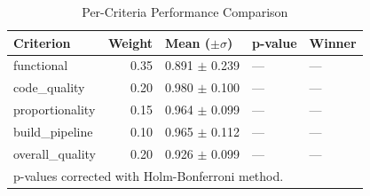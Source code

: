 \begin{table}[htbp]
\centering
\caption{Per-Criteria Performance Comparison}
\label{tab:criteria_performance}
\begin{tabular}{lrlll}
\toprule
Criterion & Weight & Mean ($\pm\sigma$) & p-value & Winner \\
\midrule
functional & 0.35 & 0.891 $\pm$ 0.239 & --- & --- \\
code\_quality & 0.20 & 0.980 $\pm$ 0.100 & --- & --- \\
proportionality & 0.15 & 0.964 $\pm$ 0.099 & --- & --- \\
build\_pipeline & 0.10 & 0.965 $\pm$ 0.112 & --- & --- \\
overall\_quality & 0.20 & 0.926 $\pm$ 0.099 & --- & --- \\
\midrule
\multicolumn{5}{l}{\footnotesize p-values corrected with Holm-Bonferroni method.} \\
\bottomrule
\end{tabular}
\end{table}

